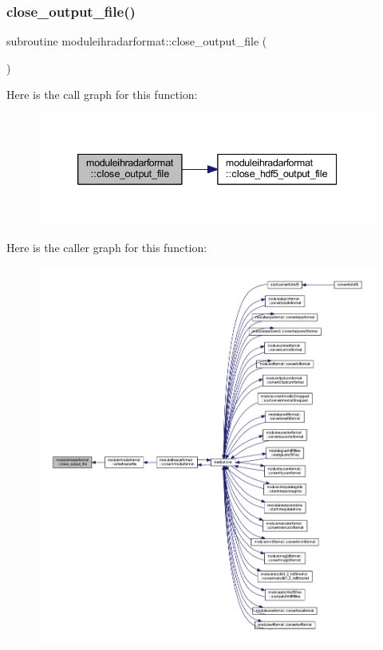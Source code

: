 \subsubsection{\texorpdfstring{close\+\_\+output\+\_\+file()}{close\_output\_file()}}
{\footnotesize\ttfamily subroutine moduleihradarformat\+::close\+\_\+output\+\_\+file (\begin{DoxyParamCaption}{ }\end{DoxyParamCaption})\hspace{0.3cm}{\ttfamily [private]}}

Here is the call graph for this function\+:\nopagebreak
\begin{figure}[H]
\begin{center}
\leavevmode
\includegraphics[width=339pt]{namespacemoduleihradarformat_a1107822e669c716ce7cbc68b6331ce30_cgraph}
\end{center}
\end{figure}
Here is the caller graph for this function\+:\nopagebreak
\begin{figure}[H]
\begin{center}
\leavevmode
\includegraphics[width=350pt]{namespacemoduleihradarformat_a1107822e669c716ce7cbc68b6331ce30_icgraph}
\end{center}
\end{figure}
\mbox{\label{namespacemoduleihradarformat_a02661cf4395883e003f6785721da99e9}} 
